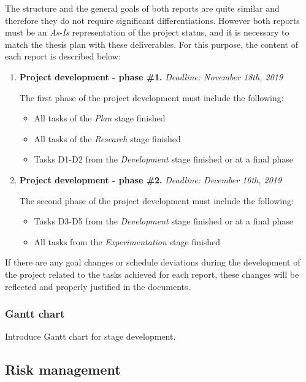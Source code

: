 \documentclass[11pt]{article}
\begin{document}
The structure and the general goals of both reports are quite similar and therefore they do not require significant differentiations. However both reports must be an \textit{As-Is} representation of the project status, and it is necessary to match the thesis plan with these deliverables. For this purpose, the content of each report is described below:

\begin{enumerate}
\item \textbf{Project development - phase \#1.} \textit{Deadline: November 18th, 2019}

The first phase of the project development must include the following:
\begin{itemize}
\item All tasks of the \textit{Plan} stage finished
\item All tasks of the \textit{Research} stage finished
\item Tasks D1-D2 from the \textit{Development} stage finished or at a final phase
\end{itemize}
\item \textbf{Project development - phase \#2.} \textit{Deadline: December 16th, 2019} 

The second phase of the project development must include the following:
\begin{itemize}
\item Tasks D3-D5 from the \textit{Development} stage finished or at a final phase
\item All tasks from the \textit{Experimentation} stage finished
\end{itemize}

\end{enumerate}

If there are any goal changes or schedule deviations during the development of the project related to the tasks achieved for each report, these changes will be reflected and properly justified in the documents.

\subsubsection{Gantt chart}

Introduce Gantt chart for stage development.

\subsection{Risk management}
\end{document}
